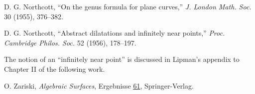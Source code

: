 \begin{description}[leftmargin=1.1cm,labelwidth=.8cm,labelsep=.3cm]
\item[{[12]}] D. G. Northcott, ``On the genus formula for plane curves,''
\textit{J. London Math. Soc.} 30 (1955), 376--382.

\item[{[13]}] D. G. Northcott, ``Abstract dilatations and infinitely near
points,'' \textit{Proc. Cambridge Philos. Soc.} 52 (1956), 178--197.

\item[] The notion of an ``infinitely near point'' is discussed in Lipman's
appendix to Chapter II of the following work.

\item[{[14]}] O. Zariski, \textit{Algebraic Surfaces}, Ergebnisse
\underline{61}, Springer-Verlag.
\end{description}

